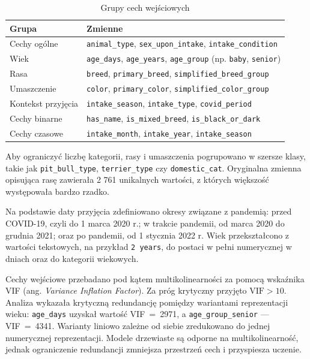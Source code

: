 \begin{table}[htbp]
\centering
\caption{Grupy cech wejściowych}
\label{tab:grupy-cech-wejsciowych}
\small
\begin{tabular}{|p{}|p{}|}
\hline
\rowcolor{LightGray}
\textbf{Grupa} & \textbf{Zmienne} \\
\hline
Cechy ogólne & \texttt{animal\_type}, \texttt{sex\_upon\_intake}, \texttt{intake\_condition} \\
\hline
Wiek & \texttt{age\_days}, \texttt{age\_years}, \texttt{age\_group} (np. \texttt{baby}, \texttt{senior}) \\
\hline
Rasa & \texttt{breed}, \texttt{primary\_breed}, \texttt{simplified\_breed\_group} \\
\hline
Umaszczenie & \texttt{color}, \texttt{primary\_color}, \texttt{simplified\_color\_group} \\
\hline
Kontekst przyjęcia & \texttt{intake\_season}, \texttt{intake\_type}, \texttt{covid\_period} \\
\hline
Cechy binarne & \texttt{has\_name}, \texttt{is\_mixed\_breed}, \texttt{is\_black\_or\_dark} \\
\hline
Cechy czasowe & \texttt{intake\_month}, \texttt{intake\_year}, \texttt{intake\_season} \\
\hline
\end{tabular}
\end{table}

Aby ograniczyć liczbę kategorii, rasy i umaszczenia pogrupowano w szersze klasy, takie jak \texttt{pit\_bull\_type}, \texttt{terrier\_type} czy \texttt{domestic\_cat}. Oryginalna zmienna opisująca rasę zawierała 2 761 unikalnych wartości, z których większość występowała bardzo rzadko.

Na podstawie daty przyjęcia zdefiniowano okresy związane z pandemią: przed COVID-19, czyli do 1 marca 2020 r.; w trakcie pandemii, od marca 2020 do grudnia 2021; oraz po pandemii, od 1 stycznia 2022 r. Wiek przekształcono z wartości tekstowych, na przykład \texttt{2 years}, do postaci w pełni numerycznej w dniach oraz do kategorii wiekowych.

Cechy wejściowe przebadano pod kątem multikolinearności za pomocą wskaźnika VIF (ang. \emph{Variance Inflation Factor}). Za próg krytyczny przyjęto $\text{VIF} > 10$. Analiza wykazała krytyczną redundancję pomiędzy wariantami reprezentacji wieku: \texttt{age\_days} uzyskał wartość VIF~=~2971, a \texttt{age\_group\_senior} --- VIF~=~4341. Warianty liniowo zależne od siebie zredukowano do jednej numerycznej reprezentacji. Modele drzewiaste są odporne na multikolinearność, jednak ograniczenie redundancji zmniejsza przestrzeń cech i przyspiesza uczenie.

